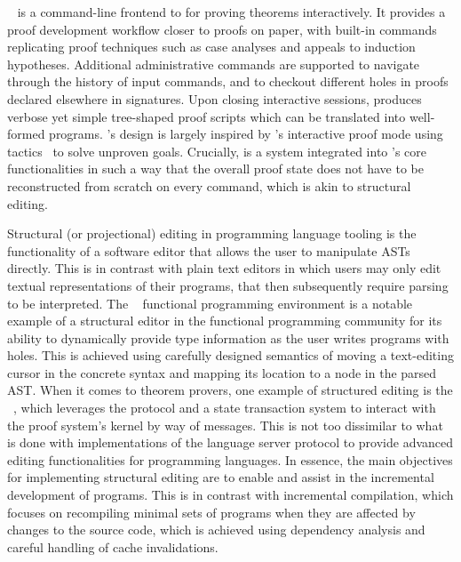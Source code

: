 
\Harpoon~\cite{errington2021harpoon} is a command-line frontend to \Beluga for proving theorems interactively.
It provides a proof development workflow closer to proofs on paper, with built-in commands replicating proof techniques such as case analyses and appeals to induction hypotheses.
Additional administrative commands are supported to navigate through the history of input commands, and to checkout different holes in proofs declared elsewhere in \Beluga signatures.
Upon closing interactive sessions, \Harpoon produces verbose yet simple tree-shaped proof scripts which can be translated into well-formed \Beluga programs.
\Harpoon's design is largely inspired by \Coq's interactive proof mode using tactics~\cite{delahaye2000tactic} to solve unproven goals.
Crucially, \Harpoon is a system integrated into \Beluga's core functionalities in such a way that the overall proof state does not have to be reconstructed from scratch on every command, which is akin to structural editing.


Structural (or projectional) editing in programming language tooling is the functionality of a software editor that allows the user to manipulate \acp{AST} directly.
This is in contrast with plain text editors in which users may only edit textual representations of their programs, that then subsequently require parsing to be interpreted.
The \Hazel~\cite{omar2017hazelnut, omar2019live} functional programming environment is a notable example of a structural editor in the functional programming community for its ability to dynamically provide type information as the user writes programs with holes.
This is achieved using carefully designed semantics of moving a text-editing cursor in the concrete syntax and mapping its location to a node in the parsed \ac{AST}.
When it comes to theorem provers, one example of structured editing is the \CoqIDE~\cite{Coq}, which leverages the \Coq \XML protocol and a state transaction system to interact with the proof system's kernel by way of messages.
This is not too dissimilar to what is done with implementations of the language server protocol to provide advanced editing functionalities for programming languages.
In essence, the main objectives for implementing structural editing are to enable and assist in the incremental development of programs.
This is in contrast with incremental compilation, which focuses on recompiling minimal sets of programs when they are affected by changes to the source code, which is achieved using dependency analysis and careful handling of cache invalidations.

